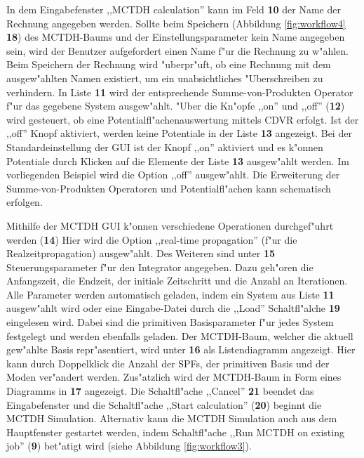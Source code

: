 In dem Eingabefenster ,,MCTDH calculation'' kann im Feld \textbf{10} der Name der Rechnung angegeben werden. 
Sollte beim Speichern (Abbildung \ref{fig:workflow4} \textbf{18}) des MCTDH-Baums und der Einstellungsparameter 
kein Name angegeben sein, wird der Benutzer 
aufgefordert einen Name f"ur die Rechnung zu w"ahlen. 
Beim Speichern der Rechnung wird "uberpr"uft, ob eine Rechnung mit dem ausgew"ahlten Namen existiert,
um ein unabsichtliches "Uberschreiben zu verhindern.
In Liste \textbf{11} wird der entsprech\-ende Summe-von-Produkten Operator f"ur das gegebene System ausgew"ahlt.
"Uber die Kn"opfe  ,,on'' und ,,off'' (\textbf{12}) wird gesteuert, ob eine Potentialfl"achenauswertung mittels 
CDVR erfolgt.
Ist der ,,off'' Knopf aktiviert, werden keine Potentiale in der Liste \textbf{13} angezeigt.
Bei der Standardeinstellung der GUI ist der Knopf ,,on'' aktiviert und es k"onnen Potentiale durch Klicken
auf die Elemente der Liste \textbf{13} ausgew"ahlt werden. Im vorliegenden Beispiel wird die Option ,,off''
ausgew"ahlt.
Die Erweiterung der Summe-von-Produkten Operatoren und Potentialfl"achen kann schematisch erfolgen.

Mithilfe der MCTDH GUI k"onnen verschiedene Operationen durchgef"uhrt werden (\textbf{14})
Hier wird die Option ,,real-time propagation'' (f"ur die Realzeitpropagation) ausgew"ahlt.
Des Weiteren sind unter \textbf{15} Steuerungsparameter f"ur den Integrator angegeben. Dazu geh"oren die Anfangszeit, die Endzeit,
der initiale Zeitschritt und die Anzahl an Iterationen. 
Alle Parameter werden automatisch geladen, indem ein System aus
Liste \textbf{11} ausgew"ahlt wird oder eine Eingabe-Datei durch 
die ,,Load'' Schaltfl"alche \textbf{19} eingelesen wird. Dabei sind die primitiven Basisparameter f"ur jedes System festgelegt und werden 
ebenfalls geladen. 
Der MCTDH-Baum, welcher die aktuell gew"ahlte Basis repr"asentiert, wird unter \textbf{16} 
als Listendiagramm angezeigt. Hier
kann durch Doppelklick die Anzahl der SPFs, der primitiven Basis und der Moden ver"andert werden.
Zus"atzlich wird der MCTDH-Baum in Form eines Diagramms in \textbf{17} angezeigt. 
Die Schaltfl"ache ,,Cancel'' \textbf{21} beendet das Eingabefenster
und die Schaltfl"ache ,,Start calculation'' (\textbf{20}) beginnt die MCTDH Simulation.
Alternativ kann die MCTDH Simulation auch aus dem Hauptfenster gestartet werden,
indem Schaltfl"ache ,,Run MCTDH on existing job'' (\textbf{9}) bet"atigt wird (siehe Abbildung \ref{fig:workflow3}).

